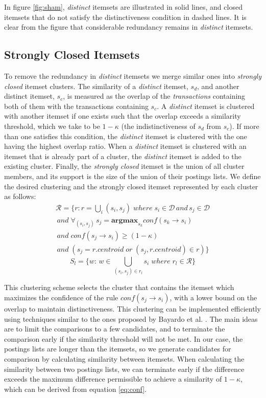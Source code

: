 \documentclass{sig-alternate}
\begin{document}
In figure \ref{fig:sham}, \emph{distinct} itemsets are illustrated in solid
lines, and closed itemsets that do not satisfy the distinctiveness condition in dashed lines.
It is clear from the figure that considerable redundancy remains in
\emph{distinct} itemsets.

\subsection{Strongly Closed Itemsets}
To remove the redundancy in \emph{distinct} itemsets we merge similar ones
into \emph{strongly closed} itemset clusters.
The similarity of a \emph{distinct} itemset,
$s_d$, and another distinct itemset, $s_c$,
is measured as the overlap of the \emph{transactions} containing both of them
with the transactions containing $s_c$. 
A \emph{distinct} itemset is clustered with another itemset if one exists
such that the overlap exceeds a similarity threshold,
which we take to be $1-\kappa$ (the indistinctiveness of $s_d$ from $s_c$).
If more than one satisfies this condition,
the  \emph{distinct} itemset is clustered with the one having the highest
overlap ratio.
When  a \emph{distinct} itemset is clustered with an itemset that is already
part of a cluster, the \emph{distinct} itemset is added to the existing cluster.
Finally, the \emph{strongly closed} itemset is the union of all cluster members,
and its support is the size of the union of their postings lists.
We define the  desired clustering  and the strongly closed itemset
represented by each cluster as follows:
\begin{align*}\label{eq:strongClosedFormal}
\mathcal{R} = \{r: r = \bigcup_i{(s_i, s_j)}\; where\; s_i \in \mathcal{D} \, and \, s_j \in \mathcal{D} 
\\\,and\; \forall_{(s_i,s_j)} \, s_j = \textbf{argmax}_{s_k} conf(s_k \rightarrow s_i) \\\,and \;conf(s_j \rightarrow s_i) \ge (1-\kappa)
\\\, and\;( s_j = r.centroid\; or \; (s_j, r.centroid) \in r )\}
\end{align*}
\begin{equation}S_l = \{w:\, w \in \bigcup_{(s_i, s_j) \in r_l}{s_i} \; where \; r_l \in \mathcal{R}\}\end{equation}

This clustering scheme selects the cluster that contains the itemset which
maximizes the confidence of the rule $conf(s_j \rightarrow s_i)$,
with a lower bound on the overlap to maintain distinctiveness. 
This clustering can be implemented efficiently using techniques similar to
the ones proposed by Bayardo et al. \cite{bayardo2007scaling}.
The main ideas are to limit the comparisons to a few candidates,
and to terminate the comparison early if the similarity threshold will not
be met.
In our case, the postings lists are longer than the itemsets,
so we generate candidates for comparison by calculating similarity between
itemsets.
When calculating the similarity between two postings lists,
we can terminate early if the difference exceeds the maximum difference
permissible to achieve a similarity of $1-\kappa$,
which can be derived from equation \ref{eq:conf}. 
\end{document}
